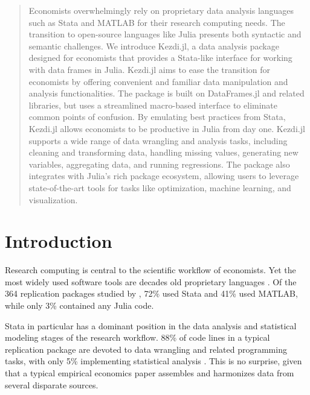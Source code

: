 \documentclass{juliacon}
\begin{document}
 
\maketitle

\begin{abstract}
Economists overwhelmingly rely on proprietary data analysis languages such as Stata and MATLAB for their research computing needs. The transition to open-source languages like Julia presents both syntactic and semantic challenges. We introduce Kezdi.jl, a data analysis package designed for economists that provides a Stata-like interface for working with data frames in Julia. Kezdi.jl aims to ease the transition for economists by offering convenient and familiar data manipulation and analysis functionalities. The package is built on DataFrames.jl and related libraries, but uses a streamlined macro-based interface to eliminate common points of confusion. By emulating best practices from Stata, Kezdi.jl allows economists to be productive in Julia from day one. Kezdi.jl supports a wide range of data wrangling and analysis tasks, including cleaning and transforming data, handling missing values, generating new variables, aggregating data, and running regressions. The package also integrates with Julia's rich package ecosystem, allowing users to leverage state-of-the-art tools for tasks like optimization, machine learning, and visualization.
\end{abstract}

\section{Introduction}

Research computing is central to the scientific workflow of economists. Yet the most widely used software tools are decades old proprietary languages \citep{koren2022adoption}. Of the 364 replication packages studied by \citet{koren2023replication}, 72\% used Stata and 41\% used MATLAB, while only 3\% contained any Julia code.

Stata in particular has a dominant position in the data analysis and statistical modeling stages of the research workflow. 88\% of code lines in a typical replication package are devoted to data wrangling and related programming tasks, with only 5\% implementing statistical analysis \citep{koren2023share}. This is no surprise, given that a typical empirical economics paper assembles and harmonizes data from several disparate sources.
\end{document}
